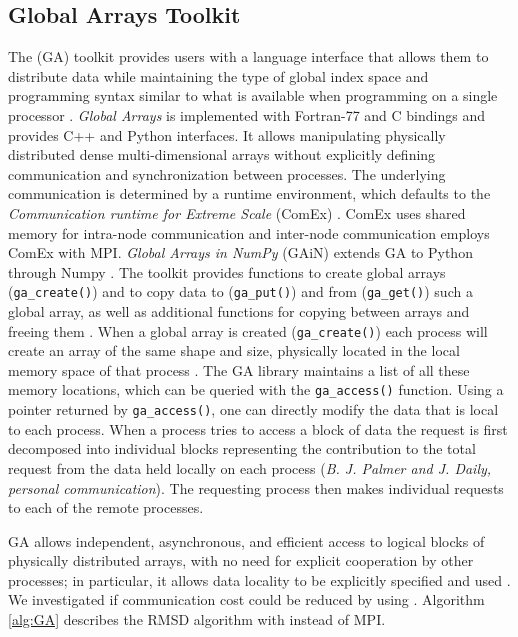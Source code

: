 \subsection{Global Arrays Toolkit}
\label{sec:methods-ga}

The  (GA) toolkit provides users with a language interface that allows them to distribute data while maintaining the type of global index space and programming syntax similar to what is available when programming on a single processor \cite{GA}.
\emph{Global Arrays} is implemented with Fortran-77 and C bindings and provides C++ and Python interfaces.
It allows manipulating physically distributed dense multi-dimensional arrays without explicitly defining communication and synchronization between processes.
The underlying communication is determined by a runtime environment, which defaults to the \emph{Communication runtime for Extreme Scale} (ComEx) \cite{Daily:2014aa}.
ComEx uses shared memory for intra-node communication and inter-node communication employs ComEx with MPI.
\emph{Global Arrays in NumPy} (GAiN) extends GA to Python through Numpy \cite{GAiN}. 
The  toolkit provides functions to create global arrays (\texttt{ga\_create()}) and to copy data to (\texttt{ga\_put()}) and from (\texttt{ga\_get()}) such a global array,  as well as additional functions for copying between arrays and freeing them \cite{GAiN}.
When a global array is created (\texttt{ga\_create()}) each process will create an array of the same shape and size, physically located in the local memory space of that process \cite{GA}. 
The GA library maintains a list of all these memory locations, which can be queried with the \texttt{ga\_access()} function.
Using a pointer returned by \texttt{ga\_access()}, one can directly modify the data that is local to each process.
When a process tries to access a block of data the request is first decomposed into individual blocks representing the contribution to the total request from the data held locally on each process (\textit{B. J. Palmer and J. Daily, personal communication}).
The requesting process then makes individual requests to each of the remote processes. 

GA allows independent, asynchronous, and efficient access to logical blocks of physically distributed arrays, with no need for explicit cooperation by other processes; in particular, it allows data locality to be explicitly specified and used \cite{GA-NUMA}.
We investigated if communication cost could be reduced by using .
Algorithm \ref{alg:GA} describes the RMSD algorithm with  instead of MPI.


